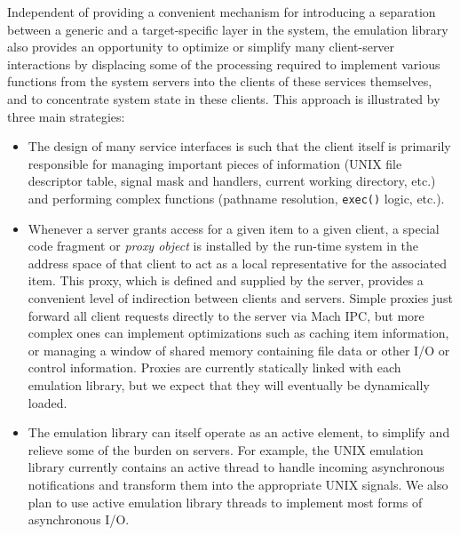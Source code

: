 Independent of providing a convenient mechanism for introducing a
separation between a generic and a target-specific layer in the
system, the emulation library also provides an opportunity to optimize
or simplify many client-server interactions by displacing some of the
processing required to implement various functions from the system
servers into the clients of these services themselves, and to
concentrate system state in these clients. This approach is
illustrated by three main strategies:
\begin{itemize}

\item The design of many service interfaces is such that the client
itself is primarily responsible for managing important pieces of
information (UNIX file descriptor table, signal mask and handlers,
current working directory, etc.) and performing complex functions
(pathname resolution, {\tt exec()} logic, etc.).

\item Whenever a server grants access for a given item to a given
client, a special code fragment or {\em proxy object}\cite{SHAPIRO86}
is installed by the run-time system in the address space of that
client to act as a local representative for the associated item. This
proxy, which is defined and supplied by the server, provides a
convenient level of indirection between clients and servers. Simple
proxies just forward all client requests directly to the server via
Mach IPC, but more complex ones can implement optimizations such as
caching item information, or managing a window of shared memory
containing file data or other I/O or control information. Proxies are
currently statically linked with each emulation library, but we expect
that they will eventually be dynamically loaded.

\item The emulation library can itself operate as an active element,
to simplify and relieve some of the burden on servers. For example,
the UNIX emulation library currently contains an active thread to
handle incoming asynchronous notifications and transform them into the
appropriate UNIX signals. We also plan to use active emulation library
threads to implement most forms of asynchronous I/O.

\end{itemize}


